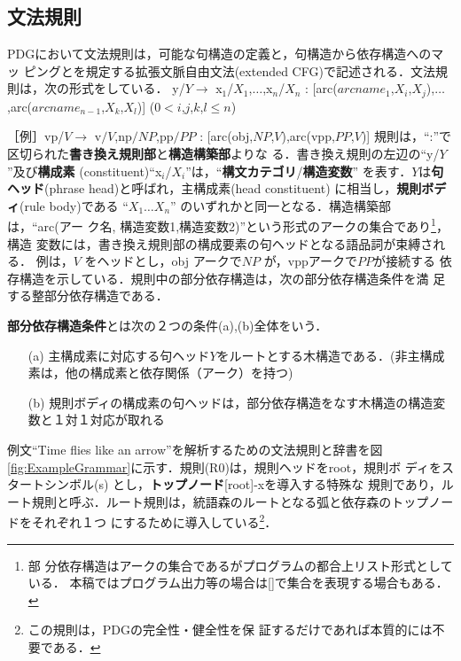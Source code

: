 \subsection{文法規則}\label{sec:bunpoukisoku}
PDGにおいて文法規則は，可能な句構造の定義と，句構造から依存構造へのマッ
ピングとを規定する拡張文脈自由文法(extended CFG)で記述される．文法規則は，次の形式をしている．
\mygapskip 
{\mynoindent}y/$Y \rightarrow$ x$_1$/$X_1$,$\ldots$,x$_n$/$X_n$ : [arc($arcname_1$,$X_i$,$X_j$),$\ldots$,arc($arcname_{n-1}$,$X_k$,$X_l$)] (0$<i$,$j$,$k$,$l{\leq}n$)

{\mynoindent}［例］vp/$V \rightarrow$ v$/V$,np$/NP$,pp$/PP$ : [arc(obj,$NP$,$V$),arc(vpp,$PP$,$V$)]
\mygapskip 
{\mynoindent}規則は，``:''で区切られた{\bf 書き換え規則部}と{\bf 構造構築部}よりな
る．書き換え規則の左辺の``y/$Y$''及び{\bf 構成素}
(constituent)``x$_i$/$X_i$''は，``{\bf 構文カテゴリ}/{\bf 構造変数}'' 
を表す．$Y$は{\bf 句ヘッド}(phrase head)と呼ばれ，主構成素(head
constituent) に相当し，{\bf 規則ボディ}(rule body)である
``$X_1{\ldots}X_n$'' のいずれかと同一となる．構造構築部は，``arc(アー
ク名, 構造変数1,構造変数2)''という形式のアークの集合であり\footnote{部
分依存構造はアークの集合であるがプログラムの都合上リスト形式としている．
本稿ではプログラム出力等の場合は[]で集合を表現する場合もある．}，構造
変数には，書き換え規則部の構成要素の句ヘッドとなる語品詞が束縛される．
例は，$V$ をヘッドとし，obj アークで$NP$ が，vppアークで$PP$が接続する
依存構造を示している．規則中の部分依存構造は，次の部分依存構造条件を満
足する整部分依存構造である．
\begin{definition} \label{def:DSCondition}
{\bf 部分依存構造条件}とは次の２つの条件(a),(b)全体をいう．
\begin{itemize}
\item[(a)] 主構成素に対応する句ヘッド$Y$をルートとする木構造である．(非主構成素は，他の構成素と依存関係（アーク）を持つ)
\item[(b)] 規則ボディの構成素の句ヘッドは，部分依存構造をなす木構造の構造変数と１対１対応が取れる
\end{itemize}
\end{definition}

例文``Time flies like an arrow''を解析するための文法規則と辞書を図
\ref{fig:ExampleGrammar}に示す．規則(R0)は，規則ヘッドをroot，規則ボ
ディをスタートシンボル(s) とし，{\bf トップノード}[root]-xを導入する特殊な
規則であり，ルート規則と呼ぶ．ルート規則は，統語森のルートとなる弧と依存森のトップノードをそれぞれ１つ
にするために導入している\footnote{この規則は，PDGの完全性・健全性を保
証するだけであれば本質的には不要である．}．

